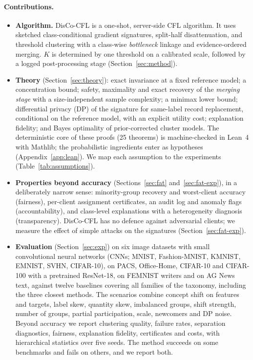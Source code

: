 \documentclass[pdflatex,sn-apa]{sn-jnl}
\theoremstyle{thmstyleone}
\theoremstyle{thmstylethree}
\begin{document}
\paragraph{Contributions.}
\begin{itemize}[leftmargin=*,itemsep=1pt]
\item \textbf{Algorithm.} DisCo-CFL is a one-shot, server-side CFL algorithm. It uses sketched class-conditional gradient signatures, split-half disattenuation, and threshold clustering with a class-wise \emph{bottleneck} linkage and evidence-ordered merging. $K$ is determined by one threshold on a calibrated scale, followed by a logged post-processing stage (Section~\ref{sec:method}).
\item \textbf{Theory} (Section~\ref{sec:theory}): exact invariance at a fixed reference model; a concentration bound; safety, maximality and exact recovery of the \emph{merging stage} with a size-independent sample complexity; a minimax lower bound; differential privacy (DP) of the signature for same-label record replacement, conditional on the reference model, with an explicit utility cost; explanation fidelity; and Bayes optimality of prior-corrected cluster models. The deterministic core of these proofs (25 theorems) is machine-checked in Lean~4 with Mathlib; the probabilistic ingredients enter as hypotheses (Appendix~\ref{app:lean}). We map each assumption to the experiments (Table~\ref{tab:assumptions}).
\item \textbf{Properties beyond accuracy} (Sections~\ref{sec:fat} and~\ref{sec:fat-exp}), in a deliberately narrow sense: minority-group recovery and worst-client accuracy (fairness), per-client assignment certificates, an audit log and anomaly flags (accountability), and class-level explanations with a heterogeneity diagnosis (transparency). DisCo-CFL has no defence against adversarial clients; we measure the effect of simple attacks on the signatures (Section~\ref{sec:fat-exp}).
\item \textbf{Evaluation} (Section~\ref{sec:exp}) on six image datasets with small convolutional neural networks (CNNs; MNIST, Fashion-MNIST, KMNIST, EMNIST, SVHN, CIFAR-10), on PACS, Office-Home, CIFAR-10 and CIFAR-100 with a pretrained ResNet-18, on FEMNIST writers and on AG News text, against twelve baselines covering all families of the taxonomy, including the three closest methods. The scenarios combine concept shift on features and targets, label skew, quantity skew, imbalanced groups, shift strength, number of groups, partial participation, scale, newcomers and DP noise. Beyond accuracy we report clustering quality, failure rates, separation diagnostics, fairness, explanation fidelity, certificates and costs, with hierarchical statistics over five seeds. The method succeeds on some benchmarks and fails on others, and we report both.
\end{itemize}
\end{document}
